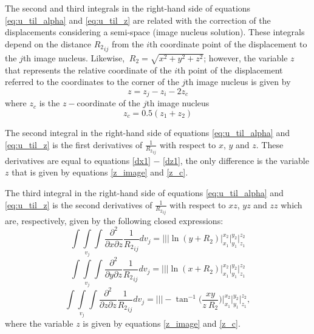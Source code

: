 \documentclass[journal abbreviation, manuscript]{copernicus}
\begin{document}
The second and third integrals in the right-hand side of equations  \ref{eq:u_til_alpha}  and \ref{eq:u_til_z} are related with the correction of the displacements considering  a semi-space (image nucleus solution).
These integrals depend on the distance ${R_2}_{ij}$ from the $i$th coordinate point of the displacement to the $j$th image nucleus.
Likewise, $\: {R_2} = \sqrt{x^{2} + y^{2} + z^{2}}$; however, the variable $z$  that represents the relative coordinate of the $i$th point of the displacement referred to the coordinates to the corner of the $j$th image nucleus is given by
\begin{equation}
z = z_j - z_i - 2 z_c
\label{z_image}
\end{equation}
where  $z_c$ is the $z-$coordinate of the $j$th image nucleus
\begin{equation}
z_c = 0.5 (z_1 + z_2)
\label{z_c}
\end{equation}

The second integral in the right-hand side of  equations  \ref{eq:u_til_alpha} and  \ref{eq:u_til_z} is the first derivatives of ${\frac{1}{{R_2}_{ij}}}$ with respect to $x$, $y$ and $z$.
These derivatives are equal to equations \ref{dx1} $-$ \ref{dz1}, the only difference is the variable $z$  that is given by equations \ref{z_image}  and \ref{z_c}.

The third integral in the right-hand side of  equations  \ref{eq:u_til_alpha}  and  \ref{eq:u_til_z} is the second derivatives of ${\frac{1}{{R_2}_{ij}}}$ with respect to $xz$, $yz$ and $zz$ which are, respectively, given by the following closed expressions: 
\begin{equation}
\int\int\limits_{v_j}\int 
\frac{\partial^{2}  }{\partial x \partial z} {\frac{1}{{R_2}_{ij}}}  dv_j = \Bigg|\Bigg|\Bigg| 
\ln(y + {R_2})
\Bigg|_{x_1}^{x_2} \Bigg|_{y_1}^{y_2} \Bigg|_{z_1}^{z_2}
\label{dx2}
\end{equation}
\begin{equation}
\int\int\limits_{v_j}\int
\frac{\partial^{2}  }{\partial y \partial z} {\frac{1}{{R_2}_{ij}}}  dv_j =
\Bigg|\Bigg|\Bigg|
\ln(x + {R_2})
\Bigg|_{x_1}^{x_2} \Bigg|_{y_1}^{y_2} \Bigg|_{z_1}^{z_2}
\label{dy2}
\end{equation}
\begin{equation}
\int\int\limits_{v_j}\int
\frac{\partial^{2}  }{\partial z \partial z} {\frac{1}{{R_2}_{ij}}}  dv_j =
\Bigg|\Bigg|\Bigg|
 -   \tan^{-1} \Bigg( \frac{xy}{z \:{R_2}} \Bigg)
\Bigg|_{x_1}^{x_2} \Bigg|_{y_1}^{y_2} \Bigg|_{z_1}^{z_2}, 
\label{dz2}
\end{equation}
where the variable $z$ is given by equations \ref{z_image}  and \ref{z_c}.
\end{document}

